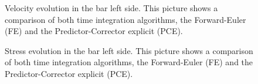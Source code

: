 \documentclass{article}
\begin{document}
\begin{figure}\sidecaption
  \centering
  \caption{Velocity evolution in the bar left side. This picture
    shows a comparison of both time integration algorithms,
    the Forward-Euler (FE) and the Predictor-Corrector explicit (PCE).}
  \label{fig:Velocity-Dyka-PCE-FE}
\end{figure}

\begin{figure}\sidecaption
  \centering
  \caption{Stress evolution in the bar left side. This picture
    shows a comparison of both time integration algorithms,
    the Forward-Euler (FE) and the Predictor-Corrector explicit (PCE).}
  \label{fig:Stress-Dyka-PCE-FE}
\end{figure}
\end{document}
